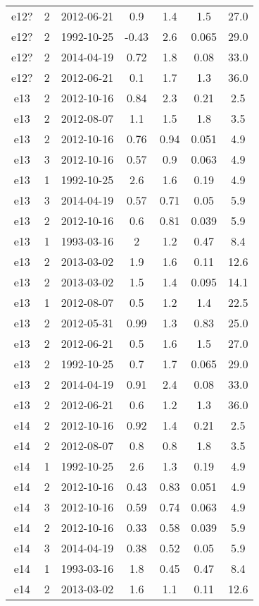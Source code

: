 \begin{table*}[htp]
\begin{tabular}{ccccccc}
e12? & 2 & 2012-06-21 & 0.9 & 1.4 & 1.5 & 27.0 \\
e12? & 2 & 1992-10-25 & -0.43 & 2.6 & 0.065 & 29.0 \\
e12? & 2 & 2014-04-19 & 0.72 & 1.8 & 0.08 & 33.0 \\
e12? & 2 & 2012-06-21 & 0.1 & 1.7 & 1.3 & 36.0 \\
e13 & 2 & 2012-10-16 & 0.84 & 2.3 & 0.21 & 2.5 \\
e13 & 2 & 2012-08-07 & 1.1 & 1.5 & 1.8 & 3.5 \\
e13 & 2 & 2012-10-16 & 0.76 & 0.94 & 0.051 & 4.9 \\
e13 & 3 & 2012-10-16 & 0.57 & 0.9 & 0.063 & 4.9 \\
e13 & 1 & 1992-10-25 & 2.6 & 1.6 & 0.19 & 4.9 \\
e13 & 3 & 2014-04-19 & 0.57 & 0.71 & 0.05 & 5.9 \\
e13 & 2 & 2012-10-16 & 0.6 & 0.81 & 0.039 & 5.9 \\
e13 & 1 & 1993-03-16 & 2 & 1.2 & 0.47 & 8.4 \\
e13 & 2 & 2013-03-02 & 1.9 & 1.6 & 0.11 & 12.6 \\
e13 & 2 & 2013-03-02 & 1.5 & 1.4 & 0.095 & 14.1 \\
e13 & 1 & 2012-08-07 & 0.5 & 1.2 & 1.4 & 22.5 \\
e13 & 2 & 2012-05-31 & 0.99 & 1.3 & 0.83 & 25.0 \\
e13 & 2 & 2012-06-21 & 0.5 & 1.6 & 1.5 & 27.0 \\
e13 & 2 & 1992-10-25 & 0.7 & 1.7 & 0.065 & 29.0 \\
e13 & 2 & 2014-04-19 & 0.91 & 2.4 & 0.08 & 33.0 \\
e13 & 2 & 2012-06-21 & 0.6 & 1.2 & 1.3 & 36.0 \\
e14 & 2 & 2012-10-16 & 0.92 & 1.4 & 0.21 & 2.5 \\
e14 & 2 & 2012-08-07 & 0.8 & 0.8 & 1.8 & 3.5 \\
e14 & 1 & 1992-10-25 & 2.6 & 1.3 & 0.19 & 4.9 \\
e14 & 2 & 2012-10-16 & 0.43 & 0.83 & 0.051 & 4.9 \\
e14 & 3 & 2012-10-16 & 0.59 & 0.74 & 0.063 & 4.9 \\
e14 & 2 & 2012-10-16 & 0.33 & 0.58 & 0.039 & 5.9 \\
e14 & 3 & 2014-04-19 & 0.38 & 0.52 & 0.05 & 5.9 \\
e14 & 1 & 1993-03-16 & 1.8 & 0.45 & 0.47 & 8.4 \\
e14 & 2 & 2013-03-02 & 1.6 & 1.1 & 0.11 & 12.6 \\

\end{tabular}
\end{table*}
